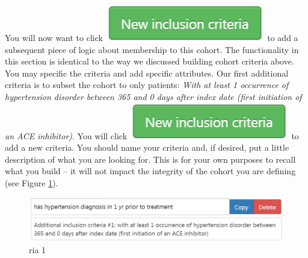 \documentclass[11pt]{book}
\theoremstyle{definition}
\theoremstyle{definition}
\theoremstyle{definition}
\theoremstyle{remark}
\begin{document}
You will now want to click \includegraphics{images/Cohorts/newinclusion.png} to add a subsequent piece of logic about membership to this cohort. The functionality in this section is identical to the way we discussed building cohort criteria above. You may specific the criteria and add specific attributes. Our first additional criteria is to subset the cohort to only patients: \emph{With at least 1 occurrence of hypertension disorder between 365 and 0 days after index date (first initiation of an ACE inhibitor)}. You will click \includegraphics{images/Cohorts/newinclusion.png} to add a new criteria. You should name your criteria and, if desired, put a little description of what you are looking for. This is for your own purposes to recall what you build -- it will not impact the integrity of the cohort you are defining (see Figure \ref{fig:addtldescription}).

\begin{figure}

{\centering \includegraphics[width=0.5\linewidth]{images/Cohorts/additional-description} 

}

\caption{ria 1}\label{fig:addtldescription}
\end{figure}
\end{document}
